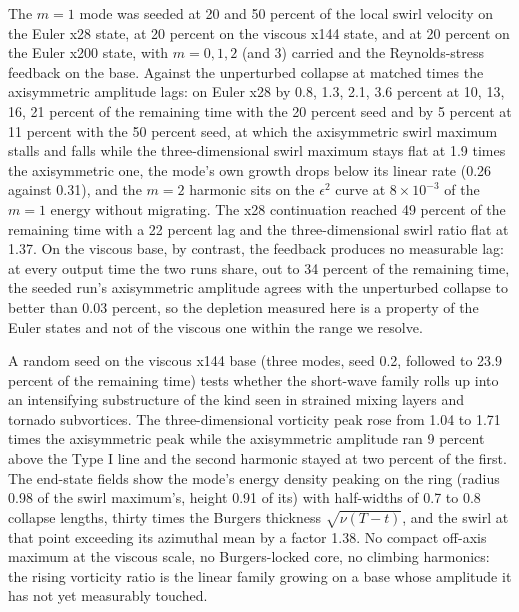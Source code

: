 \documentclass[11pt]{article}
\newcommand{\sn}[2]{#1\times 10^{#2}}
\begin{document}
The $m = 1$ mode was seeded at 20 and 50 percent of the local swirl velocity on the Euler x28 state, at 20 percent on the viscous x144 state, and at 20 percent on the Euler x200 state, with $m = 0, 1, 2$ (and 3) carried and the Reynolds-stress feedback on the base. Against the unperturbed collapse at matched times the axisymmetric amplitude lags: on Euler x28 by 0.8, 1.3, 2.1, 3.6 percent at 10, 13, 16, 21 percent of the remaining time with the 20 percent seed and by 5 percent at 11 percent with the 50 percent seed, at which the axisymmetric swirl maximum stalls and falls while the three-dimensional swirl maximum stays flat at 1.9 times the axisymmetric one, the mode's own growth drops below its linear rate (0.26 against 0.31), and the $m = 2$ harmonic sits on the $\epsilon^2$ curve at $\sn{8}{-3}$ of the $m = 1$ energy without migrating. The x28 continuation reached 49 percent of the remaining time with a 22 percent lag and the three-dimensional swirl ratio flat at 1.37. On the viscous base, by contrast, the feedback produces no measurable lag: at every output time the two runs share, out to 34 percent of the remaining time, the seeded run's axisymmetric amplitude agrees with the unperturbed collapse to better than 0.03 percent, so the depletion measured here is a property of the Euler states and not of the viscous one within the range we resolve.

A random seed on the viscous x144 base (three modes, seed 0.2, followed to 23.9 percent of the remaining time) tests whether the short-wave family rolls up into an intensifying substructure of the kind seen in strained mixing layers and tornado subvortices. The three-dimensional vorticity peak rose from 1.04 to 1.71 times the axisymmetric peak while the axisymmetric amplitude ran 9 percent above the Type I line and the second harmonic stayed at two percent of the first. The end-state fields show the mode's energy density peaking on the ring (radius 0.98 of the swirl maximum's, height 0.91 of its) with half-widths of 0.7 to 0.8 collapse lengths, thirty times the Burgers thickness $\sqrt{\nu (T - t)}$, and the swirl at that point exceeding its azimuthal mean by a factor 1.38. No compact off-axis maximum at the viscous scale, no Burgers-locked core, no climbing harmonics: the rising vorticity ratio is the linear family growing on a base whose amplitude it has not yet measurably touched.
\end{document}
